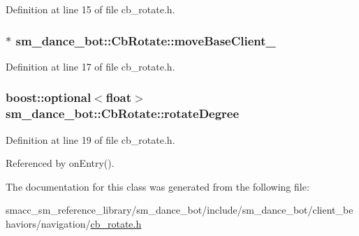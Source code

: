 Definition at line 15 of file cb\+\_\+rotate.\+h.

\subsubsection[{\texorpdfstring{move\+Base\+Client\+\_\+}{moveBaseClient_}}]{$\ast$ sm\+\_\+dance\+\_\+bot\+::\+Cb\+Rotate\+::move\+Base\+Client\+\_\+}\hypertarget{classsm__dance__bot_1_1CbRotate_a9e4fe62d3ea7ee7c31fb9b328de263fd}{}\label{classsm__dance__bot_1_1CbRotate_a9e4fe62d3ea7ee7c31fb9b328de263fd}


Definition at line 17 of file cb\+\_\+rotate.\+h.

\subsubsection[{\texorpdfstring{rotate\+Degree}{rotateDegree}}]{\setlength{\rightskip}{0pt plus 5cm}boost\+::optional$<$float$>$ sm\+\_\+dance\+\_\+bot\+::\+Cb\+Rotate\+::rotate\+Degree}\hypertarget{classsm__dance__bot_1_1CbRotate_aede47d27b6caff0d5459afd1762ddda2}{}\label{classsm__dance__bot_1_1CbRotate_aede47d27b6caff0d5459afd1762ddda2}


Definition at line 19 of file cb\+\_\+rotate.\+h.



Referenced by on\+Entry().



The documentation for this class was generated from the following file\+:\begin{DoxyCompactItemize}
\item 
smacc\+\_\+sm\+\_\+reference\+\_\+library/sm\+\_\+dance\+\_\+bot/include/sm\+\_\+dance\+\_\+bot/client\+\_\+behaviors/navigation/\hyperlink{cb__rotate_8h}{cb\+\_\+rotate.\+h}\end{DoxyCompactItemize}
